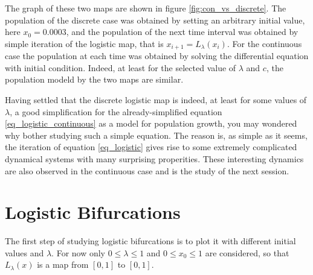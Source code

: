 \documentclass{report}
\theoremstyle{definition}
\theoremstyle{definition}
\theoremstyle{remark}
\renewcommand{\L}{L_{\lambda}(x)}
\begin{document}
The graph of these two maps are shown in figure \ref{fig:con_vs_discrete}.
The population of the discrete case was obtained by setting an arbitrary initial value, here $x_0 = 0.0003$, and the population of the next time interval was obtained by simple iteration of the logistic map, that is $x_{i+1} = L_{\lambda}(x_i)$.
For the continuous case the population at each time was obtained by solving the differential equation with initial condition.
Indeed, at least for the selected value of $\lambda$ and $c$, the population modeld by the two maps are similar.

Having settled that the discrete logistic map is indeed, at least for some values of $\lambda$, a good simplification for the already-simplified equation \ref{eq_logistic_continuous} as a model for population growth, you may wondered why bother studying such a simple equation. 
The reason is, as simple as it seems, the iteration of equation \ref{eq_logistic} gives rise to some extremely complicated dynamical systems with many surprising properities. 
These interesting dynamics are also observed in the continuous case and is the study of the next session.



\section{Logistic Bifurcations}

The first step of studying logistic bifurcations is to plot it with different initial values and $\lambda$. 
For now only $0 \leq \lambda \leq 1$ and $0 \leq x_0 \leq 1$ are considered, so that $\L$ is a map from $[0,1]$ to $[0,1]$. 
\end{document}
